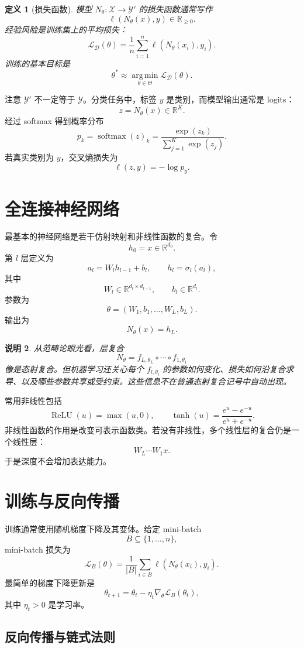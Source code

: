 \documentclass[UTF8,11pt,fontset=none]{ctexart}
\newtheorem{definition}{定义}[section]
\newtheorem{remark}[definition]{说明}
\newcommand{\R}{\mathbb{R}}
\newcommand{\D}{\mathcal D}
\newcommand{\X}{\mathcal X}
\newcommand{\Y}{\mathcal Y}
\newcommand{\Ypred}{\mathcal Y'}
\newcommand{\ThetaSet}{\Theta}
\newcommand{\Loss}{\mathcal L}
\newcommand{\softmax}{\operatorname{softmax}}
\newcommand{\argmin}{\operatorname*{arg\,min}}
\begin{document}
\begin{definition}[损失函数]
模型 \(N_\theta:\X\to\Ypred\) 的损失函数通常写作
\[
\ell(N_\theta(x),y)\in\R_{\ge 0}.
\]
经验风险是训练集上的平均损失：
\[
\Loss_{\D}(\theta)=\frac1n\sum_{i=1}^n \ell(N_\theta(x_i),y_i).
\]
训练的基本目标是
\[
\theta^\ast\approx \argmin_{\theta\in\ThetaSet}\Loss_{\D}(\theta).
\]
\end{definition}

注意 \(\Y'\) 不一定等于 \(\Y\)。分类任务中，标签 \(y\) 是类别，而模型输出通常是 logits：
\[
z=N_\theta(x)\in\R^K.
\]
经过 softmax 得到概率分布
\[
p_k=\softmax(z)_k=\frac{\exp(z_k)}{\sum_{j=1}^K\exp(z_j)}.
\]
若真实类别为 \(y\)，交叉熵损失为
\[
\ell(z,y)=-\log p_y.
\]

\section{全连接神经网络}

最基本的神经网络是若干仿射映射和非线性函数的复合。令
\[
h_0=x\in\R^{d_0}.
\]
第 \(l\) 层定义为
\[
a_l=W_lh_{l-1}+b_l,\qquad h_l=\sigma_l(a_l),
\]
其中
\[
W_l\in\R^{d_l\times d_{l-1}},\qquad b_l\in\R^{d_l}.
\]
参数为
\[
\theta=(W_1,b_1,\ldots,W_L,b_L).
\]
输出为
\[
N_\theta(x)=h_L.
\]

\begin{remark}
从范畴论眼光看，层复合
\[
N_\theta=f_{L,\theta_L}\circ\cdots\circ f_{1,\theta_1}
\]
像是态射复合。但机器学习还关心每个 \(f_{l,\theta_l}\) 的参数如何变化、损失如何沿复合求导、以及哪些参数共享或受约束。这些信息不在普通态射复合记号中自动出现。
\end{remark}

常用非线性包括
\[
\operatorname{ReLU}(u)=\max(u,0),
\qquad
\tanh(u)=\frac{e^u-e^{-u}}{e^u+e^{-u}}.
\]
非线性函数的作用是改变可表示函数类。若没有非线性，多个线性层的复合仍是一个线性层：
\[
W_L\cdots W_1x.
\]
于是深度不会增加表达能力。

\section{训练与反向传播}

训练通常使用随机梯度下降及其变体。给定 mini-batch
\[
B\subseteq\{1,\ldots,n\},
\]
mini-batch 损失为
\[
\Loss_B(\theta)=\frac1{|B|}\sum_{i\in B}\ell(N_\theta(x_i),y_i).
\]
最简单的梯度下降更新是
\[
\theta_{t+1}=\theta_t-\eta_t\nabla_\theta\Loss_B(\theta_t),
\]
其中 \(\eta_t>0\) 是学习率。

\subsection{反向传播与链式法则}
\end{document}

